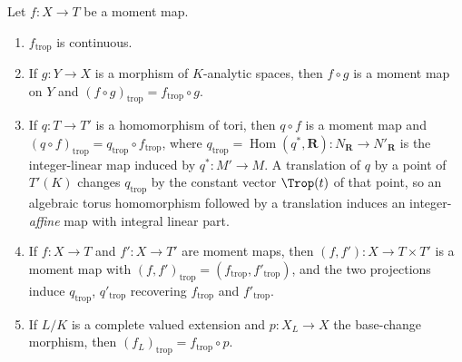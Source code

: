 \begin{lemma}
\label{lem:trop-moment-basic}
Let $f:X\to T$ be a moment map.
\begin{enumerate}
\item\label{itm:trop-moment:cont} $f_{\mathrm{trop}}$ is continuous.
\item\label{itm:trop-moment:funct} If $g:Y\to X$ is a morphism of
  $K$-analytic spaces, then $f\circ g$ is a moment map on $Y$ and
  $(f\circ g)_{\mathrm{trop}}=f_{\mathrm{trop}}\circ g$.
\item\label{itm:trop-moment:torus} If $q:T\to T'$ is a homomorphism of tori,
  then $q\circ f$ is a moment map and
  $(q\circ f)_{\mathrm{trop}}=q_{\mathrm{trop}}\circ f_{\mathrm{trop}}$,
  where $q_{\mathrm{trop}}=\operatorname{Hom}(q^*,\mathbf R):N_{\mathbf R}\to
  N'_{\mathbf R}$ is the integer-linear map induced by
  $q^*:M'\to M$. A translation of $q$ by a point of $T'(K)$ changes
  $q_{\mathrm{trop}}$ by the constant vector $\Trop(t)$ of that point, so an
  algebraic torus homomorphism followed by a translation induces an
  integer-\emph{affine} map with integral linear part.
\item\label{itm:trop-moment:prod} If $f:X\to T$ and $f':X\to T'$ are moment
  maps, then $(f,f'):X\to T\times T'$ is a moment map with
  $(f,f')_{\mathrm{trop}}=(f_{\mathrm{trop}},f'_{\mathrm{trop}})$, and the
  two projections induce $q_{\mathrm{trop}}$, $q'_{\mathrm{trop}}$ recovering
  $f_{\mathrm{trop}}$ and $f'_{\mathrm{trop}}$.
\item\label{itm:trop-moment:base} If $L/K$ is a complete valued extension and
  $p:X_L\to X$ the base-change morphism, then
  $(f_L)_{\mathrm{trop}}=f_{\mathrm{trop}}\circ p$.
\end{enumerate}
\end{lemma}

